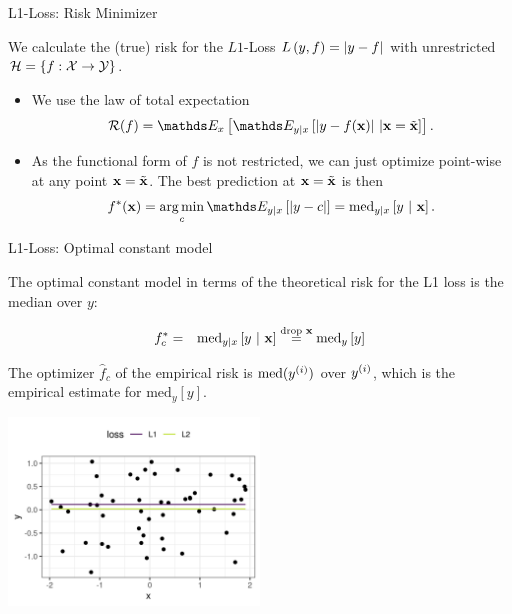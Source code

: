 \documentclass[11pt,compress,t,notes=noshow, xcolor=table]{beamer}
\begin{document}
\begin{vbframe}{L1-Loss: Risk Minimizer}

We calculate the (true) risk for the $L1$-Loss $L\left(y, f\right) = \left|y-f\right|$ with unrestricted $\mathcal{H} = \{f: \mathcal{X} \to \mathcal{Y}\}$. 

\vspace{0.5cm}

\begin{itemize}
  \setlength{\itemsep}{1.4em}  
  \item We use the law of total expectation
  \vspace{0.3cm}
  $$
    \riskf = \E_x \left[\E_{y|x}\left[|y-\fx|~|\xv = \xtil\right]\right]. 
  $$
  \item As the functional form of $f$ is not restricted, we can just optimize point-wise at any point $\mathbf{x} = \tilde{\mathbf{x}}$. The best prediction at $\mathbf{x} = \tilde{\mathbf{x}}$ is then 
  \vspace{0.3cm}  
  $$
    f^{\ast}(\xv) = \argmin_c \E_{y|x}\left[|y - c|\right]= \text{med}_{y|x} \left[y ~|~ \xv \right]. 
  $$

\end{itemize}

\end{vbframe}

\begin{vbframe}{L1-Loss: Optimal constant model}

The optimal constant model in terms of the theoretical risk for the L1 loss is the median over $y$:

\begin{eqnarray*}
  f_{c}^{\ast} &=& \text{med}_{y|x} \left[y ~|~ \mathbf{x} \right] \overset{\text{drop } \mathbf{x}}{=}  \text{med}_{y} \left[y \right]
  \end{eqnarray*} 

The optimizer $\hat{f}_c$ of the empirical risk is $\text{med}(y^{(i)})$ over $y^{(i)}$, which is the empirical estimate for $\text{med}_{y} \left[y \right]$. 

\vspace*{-0.3cm}

\begin{center}
\includegraphics[width = 0.5\textwidth ]{figure/l1_vs_l2.png} \\
\end{center}

\end{vbframe}


\endlecture
\end{document}
